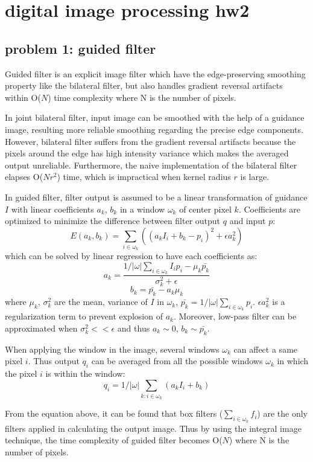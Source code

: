 \documentclass[extendedabs]{bmvc2k}
\begin{document}
\section*{digital image processing hw2}
\subsection*{problem 1: guided filter}

Guided filter \cite{guided} is an explicit image filter which have the edge-preserving 
smoothing property like the bilateral filter, but also handles gradient reversal artifacts
within O($N$) time complexity where N is the number of pixels.

In joint bilateral filter, input image can be smoothed with the help of a guidance image,
resulting more reliable smoothing regarding the precise edge components. However,
bilateral filter suffers from the gradient reversal artifacts because the pixels around
the edge has high intensity variance which makes the averaged output unreliable. 
Furthermore, the naive implementation of the bilateral filter elapses O($Nr^2$) time, 
which is impractical when kernel radius $r$ is large.

In guided filter, filter output is assumed to be a linear transformation of guidance $I$
with linear coefficients $a_k$, $b_k$ in a window $\omega_k$ of center pixel $k$.
Coefficients are optimized to minimize the difference between filter output $q$ and input $p$:
\[E(a_k,b_k) = \sum_{i \in \omega_k}((a_kI_i + b_k - p_i)^2 + \epsilon a_k^2)\]
which can be solved by linear regression to have each coefficients as:
\[a_k=\frac{1/|\omega|\sum_{i \in \omega_k}I_ip_i - \mu_k\bar{p_k}}{\sigma_k^2+\epsilon}\]
\[b_k=\bar{p_k} - a_k\mu_k\]
where $\mu_k$, $\sigma_k^2$ are the mean, variance of $I$ in $\omega_k$, 
$\bar{p_k}=1/|\omega|\sum_{i \in \omega_k}p_i$.
$\epsilon a_k^2$ is a regularization term to prevent explosion of $a_k$.
Moreover, low-pass filter can be approximated when $\sigma_k^2 << \epsilon$ and thus
$a_k \sim 0$, $b_k \sim \bar{p_k}$.

When applying the window in the image, several windows $\omega_k$ can affect a same pixel $i$.
Thus output $q_i$ can be averaged from all the possible windows $\omega_k$ in which the pixel $i$
is within the window:
\[q_i = 1/|\omega|\sum_{k:i \in \omega_k}(a_kI_i + b_k)\]

From the equation above, it can be found that box filters ($\sum_{i \in \omega_k}f_i$) are 
the only filters applied in calculating the output image. 
Thus by using the integral image technique, 
the time complexity of guided filter becomes O($N$) where N is the number of pixels.
\end{document}
